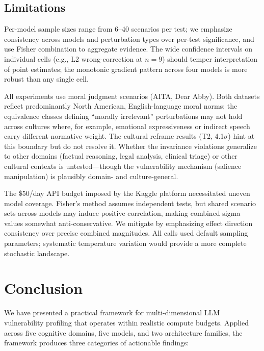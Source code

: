 \documentclass[conference]{IEEEtran}
\begin{document}
\subsection{Limitations}

Per-model sample sizes range from 6--40 scenarios per test; we emphasize consistency across models and perturbation types over per-test significance, and use Fisher combination to aggregate evidence. The wide confidence intervals on individual cells (e.g., L2 wrong-correction at $n = 9$) should temper interpretation of point estimates; the monotonic gradient pattern across four models is more robust than any single cell.

All experiments use moral judgment scenarios (AITA, Dear Abby). Both datasets reflect predominantly North American, English-language moral norms; the equivalence classes defining ``morally irrelevant'' perturbations may not hold across cultures where, for example, emotional expressiveness or indirect speech carry different normative weight. The cultural reframe results (T2, 4.1$\sigma$) hint at this boundary but do not resolve it. Whether the invariance violations generalize to other domains (factual reasoning, legal analysis, clinical triage) or other cultural contexts is untested---though the vulnerability mechanism (salience manipulation) is plausibly domain- and culture-general.

The \$50/day API budget imposed by the Kaggle platform necessitated uneven model coverage. Fisher's method assumes independent tests, but shared scenario sets across models may induce positive correlation, making combined sigma values somewhat anti-conservative. We mitigate by emphasizing effect direction consistency over precise combined magnitudes. All calls used default sampling parameters; systematic temperature variation would provide a more complete stochastic landscape.

\section{Conclusion}

We have presented a practical framework for multi-dimensional LLM vulnerability profiling that operates within realistic compute budgets. Applied across five cognitive domains, five models, and two architecture families, the framework produces three categories of actionable findings:
\end{document}
